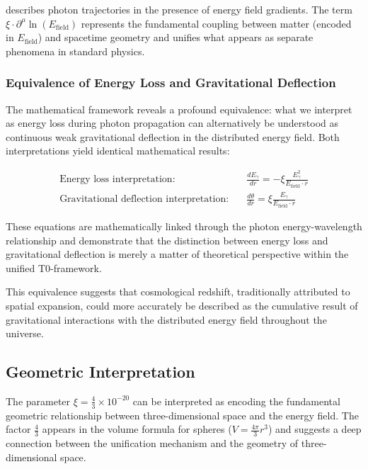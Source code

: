 \documentclass[12pt,a4paper]{article}
\newcommand{\efield}{E_{\text{field}}}
\theoremstyle{definition}
\begin{document}
	describes photon trajectories in the presence of energy field gradients. The term $\xi \cdot \partial^\mu \ln(\efield)$ represents the fundamental coupling between matter (encoded in $\efield$) and spacetime geometry and unifies what appears as separate phenomena in standard physics.
	
	\subsubsection{Equivalence of Energy Loss and Gravitational Deflection}
	
	The mathematical framework reveals a profound equivalence: what we interpret as energy loss during photon propagation can alternatively be understood as continuous weak gravitational deflection in the distributed energy field. Both interpretations yield identical mathematical results:
	
	\begin{align}
		\text{Energy loss interpretation:} \quad &\frac{dE_\gamma}{dr} = -\xi \frac{E_\gamma^2}{\efield \cdot r} \\
		\text{Gravitational deflection interpretation:} \quad &\frac{d\theta}{dr} = \xi \frac{E_\gamma}{\efield \cdot r}
	\end{align}
	
	These equations are mathematically linked through the photon energy-wavelength relationship and demonstrate that the distinction between energy loss and gravitational deflection is merely a matter of theoretical perspective within the unified T0-framework.
	
	This equivalence suggests that cosmological redshift, traditionally attributed to spatial expansion, could more accurately be described as the cumulative result of gravitational interactions with the distributed energy field throughout the universe.
	
	\subsection{Geometric Interpretation}
	
	The parameter $\xi = \frac{4}{3} \times 10^{-20}$ can be interpreted as encoding the fundamental geometric relationship between three-dimensional space and the energy field. The factor $\frac{4}{3}$ appears in the volume formula for spheres ($V = \frac{4\pi}{3}r^3$) and suggests a deep connection between the unification mechanism and the geometry of three-dimensional space.
	
\end{document}
